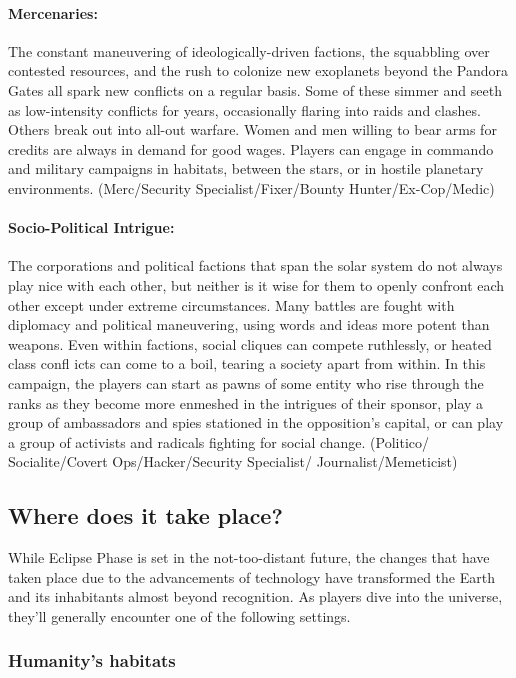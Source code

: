 \paragraph{Mercenaries:} The constant maneuvering of
ideologically-driven factions, the squabbling over contested
resources, and the rush to colonize new exoplanets beyond the Pandora
Gates all spark new conflicts on a regular basis. Some of these simmer
and seeth as low-intensity conflicts for years, occasionally flaring
into raids and clashes. Others break out into all-out warfare. Women
and men willing to bear arms for credits are always in demand for good
wages. Players can engage in commando and military campaigns in
habitats, between the stars, or in hostile planetary
environments. (Merc/Security Specialist/Fixer/Bounty
Hunter/Ex-Cop/Medic)

\paragraph{Socio-Political Intrigue:} The corporations and political
factions that span the solar system do not always play nice with each
other, but neither is it wise for them to openly confront each other
except under extreme circumstances. Many battles are fought with
diplomacy and political maneuvering, using words and ideas more potent
than weapons.  Even within factions, social cliques can compete
ruthlessly, or heated class confl icts can come to a boil, tearing a
society apart from within. In this campaign, the players can start as
pawns of some entity who rise through the ranks as they become more
enmeshed in the intrigues of their sponsor, play a group of
ambassadors and spies stationed in the opposition's capital, or can
play a group of activists and radicals fighting for social
change. (Politico/ Socialite/Covert Ops/Hacker/Security Specialist/
Journalist/Memeticist)

\subsection{Where does it take place?}
\label{sec:where-does-it}

While Eclipse Phase is set in the not-too-distant future, the changes
that have taken place due to the advancements of technology have
transformed the Earth and its inhabitants almost beyond recognition.
As players dive into the universe, they'll generally encounter one of
the following settings.

\subsubsection{Humanity's habitats}
\label{sec:humanitys-habitats}

